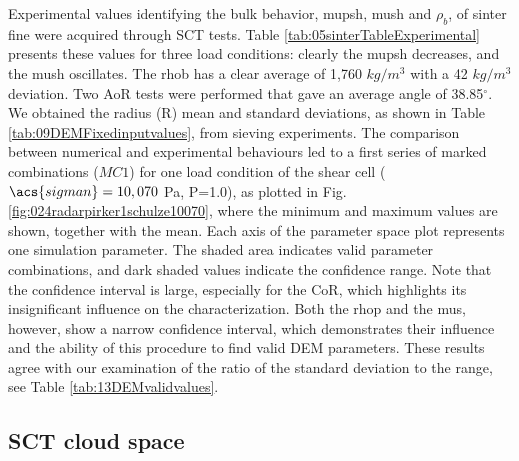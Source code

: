 Experimental values identifying the bulk behavior, \acs{mupsh}, \acs{mush} and $\rho_{b}$, 
of sinter fine were acquired through \acs{SCT} tests. 
Table \ref{tab:05sinterTableExperimental} presents
these values for three load conditions: clearly the \acs{mupsh} decreases, and 
the \acs{mush} oscillates.
The \acs{rhob} has a clear average of 1,760 $kg/m^3$ with a 42 
$kg/m^3$ deviation.
Two \acs{AoR} tests were performed that gave an average angle of
38.85$^\circ$.
We obtained the radius (\acs{R}) mean and standard
deviations, as shown in Table
\ref{tab:09DEMFixedinputvalues}, from sieving experiments.
The comparison between numerical and experimental behaviours led to a first
series of marked combinations ($MC1$) for one load condition of
the shear cell ($\acs{sigman} = 10,070$ Pa, P=1.0), as plotted in Fig.
\ref{fig:024radarpirker1schulze10070}, where 
the minimum and maximum values are shown, together with the mean. 
Each axis of the parameter space plot represents one simulation parameter.
The shaded area indicates valid parameter combinations, and dark shaded
values indicate the confidence range.
Note that the confidence interval is large, 
especially for the \acs{CoR}, which highlights its insignificant influence on the
characterization.
Both the \acs{rhop}  and the \acs{mus}, however, show a narrow confidence interval, 
which demonstrates their influence and the ability of this procedure to find
valid \acs{DEM} parameters.
These results agree with our examination of the ratio of the standard deviation
to the range, see Table \ref{tab:13DEMvalidvalues}.

\subsection{SCT cloud space}
\label{subsec:sctcloudspace}

